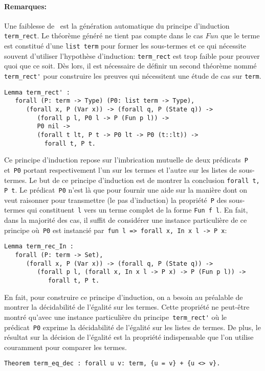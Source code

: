 \paragraph{Remarques:}
Une faiblesse de \coq\ est la génération automatique du principe
d'induction \lstinline!term_rect!. Le théorème généré ne tient pas
compte dans le cas $Fun$ que le terme est constitué d'une
\lstinline!list term! pour former les sous-termes et ce qui
nécessite souvent d'utiliser l'hypothèse d'induction:
\lstinline!term_rect! est trop faible pour prouver quoi que ce soit.
Dès lors, il est nécessaire de définir un second théorème nommé \lstinline!term_rect'! pour
construire les preuves qui nécessitent une étude de cas sur \lstinline!term!.
\begin{lstlisting}
Lemma term_rect' : 
   forall (P: term -> Type) (P0: list term -> Type),
      (forall x, P (Var x)) -> (forall q, P (State q)) ->
         (forall p l, P0 l -> P (Fun p l)) ->
         P0 nil ->
         (forall t lt, P t -> P0 lt -> P0 (t::lt)) ->
           forall t, P t.
\end{lstlisting}
Ce principe d'induction repose sur l'imbrication mutuelle de deux prédicats~\lstinline!P! et~\lstinline!P0!
portant respectivement l'un sur les termes et l'autre sur les listes de sous-termes. Le but de ce principe
d'induction est de montrer la conclusion \lstinline!forall t, P t!.
Le prédicat~\lstinline!P0! n'est là que pour fournir une aide sur la manière dont on veut raisonner pour transmettre
(le pas d'induction) la propriété~\lstinline!P! des sous-termes qui constituent~\lstinline!l! vers un terme complet de la forme \lstinline!Fun f l!.
En fait, dans la majorité des cas, il suffit de considérer une instance particulière de ce principe 
où~\lstinline!P0! est instancié par~\lstinline!fun l => forall x, In x l -> P x!:
\begin{lstlisting}
Lemma term_rec_In :
   forall (P: term -> Set),
      (forall x, P (Var x)) -> (forall q, P (State q)) ->
         (forall p l, (forall x, In x l -> P x) -> P (Fun p l)) ->
            forall t, P t.
\end{lstlisting}
En fait, pour construire ce principe d'induction, on a besoin au préalable de montrer la décidabilité de l'égalité
sur les termes. Cette propriété ne peut-être montré qu'avec une instance particulière du principe~\lstinline!term_rect'!
où le prédicat~\lstinline!P0! exprime la décidabilité de l'égalité sur les listes de termes.
De plus, le résultat sur la décision de l'égalité est la propriété indispensable que l'on utilise couramment 
pour comparer les termes. %
\begin{lstlisting}
Theorem term_eq_dec : forall u v: term, {u = v} + {u <> v}.
\end{lstlisting}


